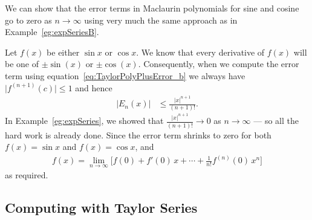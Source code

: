 We can show that the error terms in Maclaurin polynomials for
sine and cosine go to zero as $n \to \infty$ using
very much the same approach as in Example~\ref{eg:expSeriesB}.
\begin{eg}[Optional --- Why
$\sum_{n=0}^\infty\frac{(-1)^n}{(2n+1)!}x^{2n+1}=\sin x$
and
$\sum_{n=0}^\infty\frac{(-1)^n}{(2n)!}x^{2n}=\cos x$
]\label{eg:sincosSeriesB}
Let $f(x)$ be either $\sin x$ or $\cos x$. We know that every
derivative of $f(x)$ will be one of $\pm \sin(x)$ or $\pm \cos(x)$.
Consequently, when we compute the error term using
equation~\eqref{eq:TaylorPolyPlusError_b}
we always have $\big|f^{(n+1)}(c)\big|\le 1$ and hence
\begin{align*}
|E_n(x)| &\le \frac{|x|^{n+1}}{(n+1)!}.
\end{align*}
In Example~\ref{eg:expSeries}, we showed that
$\frac{|x|^{n+1}}{(n+1)!} \to 0$ as $n \to \infty$ --- so all the
hard work is already done. Since the error term shrinks to zero for both $f(x)=\sin x$ and $f(x)=\cos x$, and
\begin{align*}
f(x)=\lim_{n\rightarrow\infty}\Big[f(0)+f'(0)\,x+\cdots
                +\tfrac{1}{n!}f^{(n)}(0)\, x^n\Big]
\end{align*}
as required.

\end{eg}


\subsection{Computing with Taylor Series}


